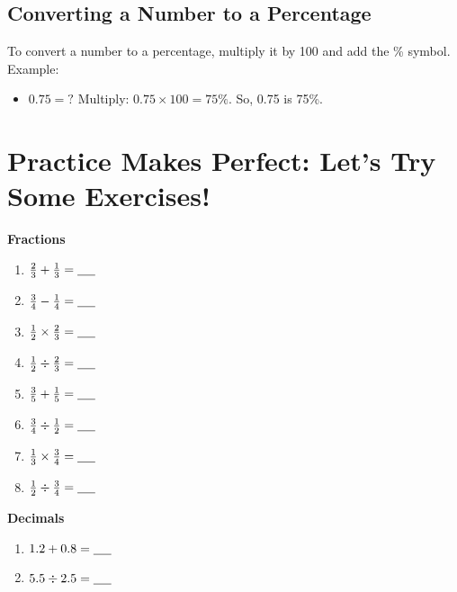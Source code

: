 \subsection{Converting a Number to a Percentage}
To convert a number to a percentage, multiply it by 100 and add the \% symbol. Example:
\begin{itemize}
    \item $0.75 = ?$ Multiply: $0.75 \times 100 = 75\%$. So, 0.75 is 75\%.
\end{itemize}

\section{Practice Makes Perfect: Let’s Try Some Exercises!}
\begin{multicols}{2}
    \textbf{Fractions}
    \begin{enumerate}[label=(\alph*)]
        \item $\frac{2}{3} + \frac{1}{3} = \underline{\hspace{0.5cm}}$
        \item $\frac{3}{4} - \frac{1}{4} = \underline{\hspace{0.5cm}}$
        \item $\frac{1}{2} \times \frac{2}{3} = \underline{\hspace{0.5cm}}$
        \item $\frac{1}{2} \div \frac{2}{3} = \underline{\hspace{0.5cm}}$
        \item $\frac{3}{5} + \frac{1}{5} = \underline{\hspace{0.5cm}}$
        \item $\frac{3}{4} \div \frac{1}{2} = \underline{\hspace{0.5cm}}$
        \item $\frac{1}{3} \times \frac{3}{4} = \underline{\hspace{0.5cm}}$
        \item $\frac{1}{2} \div \frac{3}{4} = \underline{\hspace{0.5cm}}$
    \end{enumerate}
    \textbf{Decimals}
    \begin{enumerate}[label=(\alph*)]
        \item $1.2 + 0.8 = \underline{\hspace{0.5cm}}$
        \item $5.5 \div 2.5 = \underline{\hspace{0.5cm}}$

\end{enumerate}
\end{multicols}
